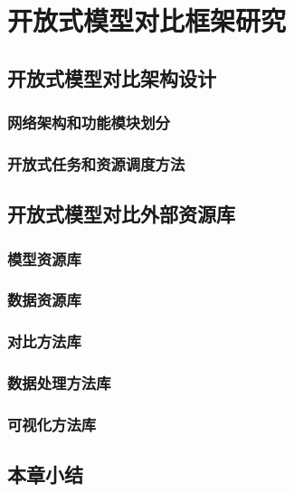 \chapter{开放式模型对比框架研究}

\section{开放式模型对比架构设计}
\subsection{网络架构和功能模块划分}
\subsection{开放式任务和资源调度方法}

\section{开放式模型对比外部资源库}
\subsection{模型资源库}

\subsection{数据资源库}

\subsection{对比方法库}

\subsection{数据处理方法库}

\subsection{可视化方法库}

\section{本章小结}